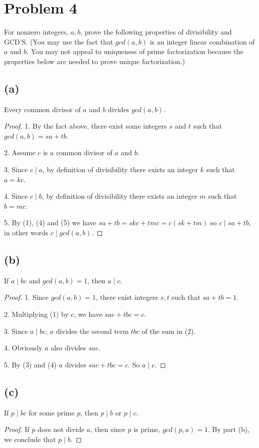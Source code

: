 \documentclass[14pt]{extarticle}
\begin{document}
\section{Problem 4}
For nonzero integers, $a, b$, prove the following properties of divisibility and GCD’S. (You may use the fact that $gcd(a, b)$ is an integer linear combination of $a$ and $b$. You may not appeal to uniqueness of prime factorization because the properties below are needed to prove unique factorization.)

\subsection{(a)}
Every common divisor of $a$ and $b$ divides $gcd(a, b)$.
\begin{proof}
1. By the fact above, there exist some integers $s$ and $t$ such that $gcd(a, b) = sa + tb$. 

2. Assume $c$ is a common divisor of $a$ and $b$. 

3. Since $c \mid a$, by definition of divisibility there exists an integer $k$ such that $a = kc$.

4. Since $c \mid b$, by definition of divisibility there exists an integer $m$ such that $b = mc$.

5. By (1), (4) and (5) we have $sa + tb = skc + tmc = c(sk + tm)$
so $c \mid sa + tb$, in other words $c \mid gcd(a,b)$.
\end{proof}

\subsection{(b)}
If $a \mid bc$ and $gcd(a, b) = 1$, then $a \mid c$.
\begin{proof}
1. Since $gcd(a, b) = 1$, there exist integers $s, t$ such that $sa + tb = 1$. 

2. Multiplying (1) by $c$, we have $sac + tbc = c$.

3. Since $a \mid bc$, $a$ divides the second term $tbc$ of the sum in (2). 

4. Obviously $a$ also divides $sac$.

5. By (3) and (4) $a$ divides $sac + tbc = c$. So $a \mid c$.
\end{proof}

\subsection{(c)}
If $p \mid bc$ for some prime $p$, then $p \mid b$ or $p \mid c$.
\begin{proof}
If $p$ does not divide $a$, then since $p$ is prime, $gcd(p, a) = 1$. By part (b), we conclude that $p \mid b$.
\end{proof}
\end{document}
